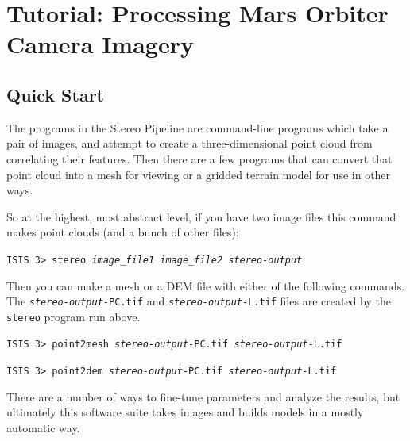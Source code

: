 \chapter{Tutorial: Processing Mars Orbiter Camera Imagery}
\label{ch:tutorial}

\section{Quick Start}

The programs in the Stereo Pipeline are command-line programs which
take a pair of images, and attempt to create a three-dimensional
point cloud from correlating their features.  Then there are a few
programs that can convert that point cloud into a mesh for viewing
or a gridded terrain model for use in other ways.

So at the highest, most abstract level, if you have two image files
this command makes point clouds (and a bunch of other files):

\hspace*{2em}\texttt{ISIS 3> stereo \textit{image\_file1 image\_file2 stereo-output}}
\smallskip

Then you can make a mesh or a \ac{DEM} file with either of the following
commands.  The \texttt{\textit{stereo-output}-PC.tif} and
\texttt{\textit{stereo-output}-L.tif} files are created by the \texttt{stereo}
program run above.

\hspace*{2em}\texttt{ISIS 3> point2mesh \textit{stereo-output}-PC.tif \textit{stereo-output}-L.tif}
\smallskip

\hspace*{2em}\texttt{ISIS 3> point2dem \textit{stereo-output}-PC.tif \textit{stereo-output}-L.tif}
\smallskip

There are a number of ways to fine-tune parameters and
analyze the results, but ultimately this software suite takes images
and builds models in a mostly automatic way.

